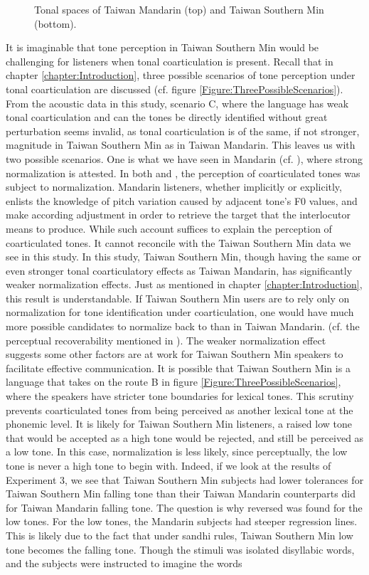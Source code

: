 \documentclass[12pt]{report}
\begin{document}
\begin{CJK}{UTF8}{bsmi}
\begin{figure}[hbt!]
\caption{Tonal spaces of Taiwan Mandarin (top) and Taiwan Southern Min (bottom).}
\label{Figure:ToneSpace}
\end{figure}
It is imaginable that tone perception in Taiwan Southern Min would be challenging for listeners when tonal coarticulation is present. Recall that in chapter \ref{chapter:Introduction}, three possible scenarios of tone perception under tonal coarticulation are discussed (cf. figure \ref{Figure:ThreePossibleScenarios}). From the acoustic data in this study, scenario C, where the language has weak tonal coarticulation and can the tones be directly identified without great perturbation seems invalid, as tonal coarticulation is of the same, if not stronger, magnitude in Taiwan Southern Min as in Taiwan Mandarin. This leaves us with two possible scenarios. One is what we have seen in Mandarin (cf. \citealp{Zhangetal2022}), where strong normalization is attested. In both \cite{Xu1994} and \citeauthor{Zhangetal2022}, the perception of coarticulated tones was subject to normalization. Mandarin listeners, whether implicitly or explicitly, enlists the knowledge of pitch variation caused by adjacent tone's F0 values, and make according adjustment in order to retrieve the target that the interlocutor means to produce. While such account suffices to explain the perception of coarticulated tones. It cannot reconcile with the Taiwan Southern Min data we see in this study. In this study, Taiwan Southern Min, though having the same or even stronger tonal coarticulatory effects as Taiwan Mandarin, has significantly weaker normalization effects. Just as mentioned in chapter \ref{chapter:Introduction}, this result is understandable. If Taiwan Southern Min users are to rely only on normalization for tone identification under coarticulation, one would have much more possible candidates to normalize back to than in Taiwan Mandarin. (cf. the perceptual recoverability mentioned in \citealp{Flemming2011}). The weaker normalization effect suggests some other factors are at work for Taiwan Southern Min speakers to facilitate effective communication. It is possible that Taiwan Southern Min is a language that takes on the route B in figure \ref{Figure:ThreePossibleScenarios}, where the speakers have stricter tone boundaries for lexical tones. This scrutiny prevents coarticulated tones from being perceived as another lexical tone at the phonemic level. It is likely for Taiwan Southern Min listeners, a raised low tone that would be accepted as a high tone would be rejected, and still be perceived as a low tone. In this case, normalization is less likely, since perceptually, the low tone is never a high tone to begin with. Indeed, if we look at the results of Experiment 3, we see that Taiwan Southern Min subjects had lower tolerances for Taiwan Southern Min falling tone than their Taiwan Mandarin counterparts did for Taiwan Mandarin falling tone. The question is why reversed was found for the low tones. For the low tones, the Mandarin subjects had steeper regression lines. This is likely due to the fact that under sandhi rules, Taiwan Southern Min low tone becomes the falling tone. Though the stimuli was isolated disyllabic words, and the subjects were instructed to imagine the words 
\end{CJK}
\end{document}
